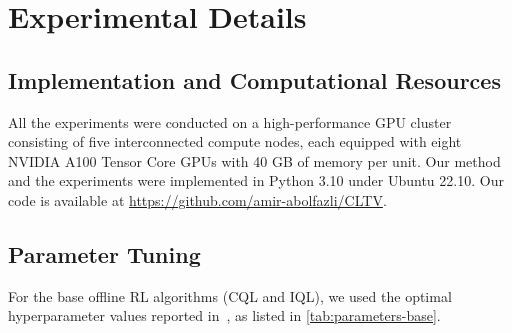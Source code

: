 \section{Experimental Details}
\label{ex-details}

\subsection{Implementation and Computational Resources}
\label{sec-technical-details}
All the experiments were conducted on a high-performance GPU cluster consisting of five interconnected compute nodes, each equipped with eight NVIDIA A100 Tensor Core GPUs with 40 GB of memory per unit. Our method and the experiments were implemented in Python 3.10 under Ubuntu 22.10. Our code
is available at \href{https://github.com/amir-abolfazli/CLTV}{https://github.com/amir-abolfazli/CLTV}.




\subsection{Parameter Tuning}
\label{param-tuning}
For the base offline RL algorithms (CQL and IQL), we used the optimal hyperparameter values reported in~\citep{seno2022d3rlpy}, as listed in \autoref{tab:parameters-base}. 



